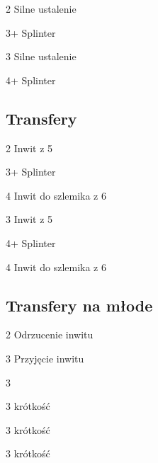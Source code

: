 \documentclass[12pt, a4paper]{article}
\begin{document}
\begin{options}[2]
    \item[2\spades] Silne ustalenie \hearts \imp
    \item[3\spades+] Splinter 
\end{options}

\begin{options}[2]
    \item[3\hearts] Silne ustalenie \spades \imp
    \item[4\clubs+] Splinter 
\end{options}


\subsection*{Transfery}
\begin{options}[2]
    \item[2\spades] Inwit z 5\spades
    \item[3\spades+] Splinter 
    \item[4\hearts] Inwit do szlemika z 6  
\end{options}

\begin{options}[2]
    \item[3\hearts] Inwit z 5\hearts
    \item[4\clubs+] Splinter 
    \item[4\spades] Inwit do szlemika z 6  
\end{options}

\subsection*{Transfery na młode}

\begin{options}[1]
    \item[2\nt] Odrzucenie inwitu
    \item[3\clubs] Przyjęcie inwitu  
\end{options}

\begin{options}[2]
    \item[3\clubs] \soff
    \item[3\diams] krótkość
    \item[3\hearts] krótkość
    \item[3\spades] krótkość   
\end{options}
\end{document}
